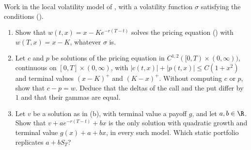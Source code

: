 \begin{exercise}\label{ex:fk-parity}
\easy Work in the local volatility model of , with a volatility
function $\sigma$ satisfying the conditions ().
\begin{enumerate}[label=(\alph*)]
  \item Show that $w(t,x)=x-Ke^{-r(T-t)}$ solves the pricing equation ()
    with $w(T,x)=x-K$, whatever $\sigma$ is.
  \item Let $c$ and $p$ be solutions of the pricing equation in $C^{1,2}([0,T)\times(0,\infty))$,
    continuous on $[0,T]\times(0,\infty)$, with $|c(t,x)|+|p(t,x)|\le C(1+x^2)$ and terminal values
    $(x-K)^+$ and $(K-x)^+$. Without computing $c$ or $p$, show that $c-p=w$. Deduce that the deltas
    of the call and the put differ by $1$ and that their gammas are equal.
  \item Let $v$ be a solution as in (b), with terminal value a payoff $g$, and let $a,b\in\R$.
    Show that $v+ae^{-r(T-t)}+bx$ is the only solution with quadratic growth and terminal value
    $g(x)+a+bx$, in every such model. Which static portfolio replicates $a+bS_T$?
\end{enumerate}
\end{exercise}


